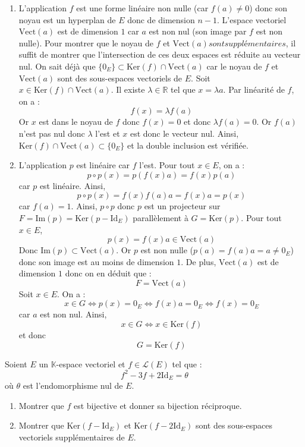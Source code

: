 \documentclass[a4paper,10pt]{report}
\begin{document}
\begin{enumerate}
\item L'application $f$ est une forme linéaire non nulle (car $f(a) \neq 0$) donc son noyau est un hyperplan de $E$ donc de dimension $n-1$. L'espace vectoriel $\textrm{Vect}(a)$ est de dimension $1$ car $a$ est non nul (son image par $f$ est non nulle). Pour montrer que le noyau de $f$ et $\textrm{Vect}(a) sont supplémentaires$, il suffit de montrer que l'intersection de ces deux espaces est réduite au vecteur nul. On sait déjà que $\lbrace 0_E \rbrace \subset \textrm{Ker}(f) \cap \textrm{Vect}(a)$ car le noyau de $f$ et $\textrm{Vect}(a)$ sont des sous-espaces vectoriels de $E$. Soit $x \in \textrm{Ker}(f) \cap \textrm{Vect}(a)$. Il existe $\lambda \in \mathbb{R}$ tel que $x= \lambda a$. Par linéarité de $f$, on a :
$$ f(x) = \lambda f(a)$$
Or $x$ est dans le noyau de $f$ donc $f(x) = 0$ et donc $\lambda f(a) = 0$. Or $f(a)$ n'est pas nul donc $\lambda$ l'est et $x$ est donc le vecteur nul. Ainsi, $\textrm{Ker}(f) \cap \textrm{Vect}(a) \subset \lbrace 0_E \rbrace$ et la double inclusion est vérifiée.
\item L'application $p$ est linéaire car $f$ l'est. Pour tout $x \in E$, on a :
$$ p \circ p (x) = p(f(x) a) = f(x) p(a)$$
car $p$ est linéaire. Ainsi,
$$ p \circ p (x) = f(x) f(a) a = f(x) a = p(x)$$
car $f(a)=1$. Ainsi, $p \circ p$ donc $p$ est un projecteur sur $F= \textrm{Im}(p)= \textrm{Ker}(p- \textrm{Id}_E)$ parallèlement à $G = \textrm{Ker}(p)$. Pour tout $x \in E$,
$$ p(x) = f(x) a \in \textrm{Vect}(a)$$
Donc $\textrm{Im}(p) \subset \textrm{Vect}(a)$. Or $p$ est non nulle ($p(a)=f(a) a= a \neq 0_E$) donc son image est au moins de dimension $1$. De plus, $\textrm{Vect}(a)$ est de dimension $1$ donc on en déduit que :
$$ F = \textrm{Vect}(a)$$
Soit $x \in E$. On a :
$$ x \in G \Longleftrightarrow p(x) = 0_E \Longleftrightarrow f(x) a = 0_E \Longleftrightarrow f(x) = 0_E$$
car $a$ est non nul. Ainsi,
$$ x \in G \Longleftrightarrow x \in \textrm{Ker}(f)$$
et donc 
$$ G = \textrm{Ker}(f)$$
\end{enumerate}

\begin{Exa} Soient $E$ un $\mathbb{K}$-espace vectoriel et $f \in \mathcal{L}(E)$ tel que :
    \[
    f^2 - 3f + 2 \textrm{Id}_E = \theta
    \]
où $\theta$ est l'endomorphisme nul de $E$.
    \begin{enumerate}
      \item Montrer que $f$ est bijective et donner sa bijection réciproque.
      \item Montrer que $\textrm{Ker}(f - \textrm{Id}_E)$ et $\textrm{Ker}(f - 2\textrm{Id}_E)$ sont des sous-espaces vectoriels supplémentaires de $E$.
    \end{enumerate}
\end{Exa}
\end{document}
